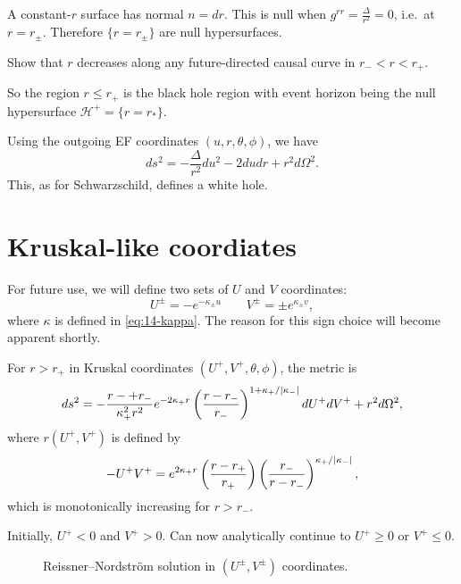 A constant-$r$ surface has normal $n = dr$. This is null when $g^{rr} = \frac{\Delta}{r^2} = 0$, i.e.~at $r = r_{\pm}$.
Therefore $\{r = r_{\pm}\}$ are null hypersurfaces.
\begin{exercise}
  Show that $r$ decreases along any future-directed causal curve in $r_- < r < r_+$.
\end{exercise}
So the region $r \leq r_+$ is the black hole region with event horizon being the null hypersurface $\mathcal{H}^+ = \{r = r_*\}$.

Using the outgoing EF coordinates $(u, r, \theta, \phi)$, we have
\begin{equation}
  ds^2 = -\frac{\Delta}{r^2} du^2 - 2du dr + r^2 d\Omega^2.
\end{equation}
This, as for Schwarzschild, defines a white hole.

\section{Kruskal-like coordiates}%
\label{sec:kruskal_like_coordiates}

For future use, we will define two sets of $U$ and $V$ coordinates:
\begin{equation}
  \label{eq:14-star}
  U^{\pm} = -e^{-\kappa_{\pm} u} \qquad V^{\pm} = \pm e^{\kappa_{\pm} v},
\end{equation}
where $\kappa$ is defined in \eqref{eq:14-kappa}.
The reason for this sign choice will become apparent shortly.

For $r > r_+$ in Kruskal coordinates $(U^+, V^+, \theta, \phi)$, the metric is
\begin{equation}
  ds^2 = -\frac{r-+ r_-}{\kappa_+^2 r^2} e^{-2 \kappa_+ r} \left( \frac{r - r_-}{r_-} \right)^{1 + \kappa_+/\abs{\kappa_-}} dU^+ dV^+ + r^2 d\Omega^2,
\end{equation}
where $r(U^+, V^+)$ is defined by
\begin{equation}
  -U^+ V^+ = e^{2 \kappa_+ r} \left( \frac{r - r_+}{r_+} \right) \left(\frac{r_-}{r - r_-} \right)^{\kappa_+/\abs{\kappa_-}},
\end{equation}
which is monotonically increasing for $r > r_-$.

Initially, $U^+ < 0$ and $V^+ > 0$.
Can now analytically continue to $U^+ \geq 0$ or $V^+ \leq 0$.
\begin{figure}[tbhp]
  \centering
  \begin{subfigure}[t]{0.5\columnwidth}
    \centering
    \def\svgwidth{1\columnwidth}
    
    \caption{}
    \label{fig:l14f1}
  \end{subfigure}%
  \begin{subfigure}[t]{0.5\columnwidth}
    \centering
    \def\svgwidth{0.8\columnwidth}
    
    \caption{}
    \label{fig:l14f2}
  \end{subfigure}
  \caption{Reissner--Nordström solution in $(U^{\pm}, V^{\pm})$ coordinates.}
\end{figure}

